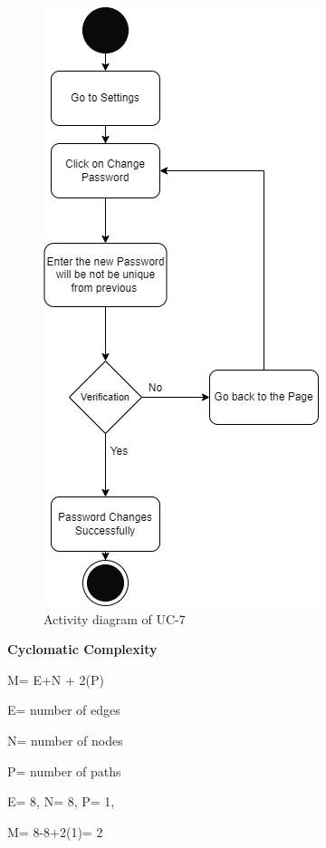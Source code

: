 \begin{figure}[H]
    \centering
    \includegraphics[scale=0.7]{./diagrams/Activity Diagram/ad-05.png}
    \caption{Activity diagram of UC-7}
    \label{fig:act-05}

\end{figure}


\textbf{Cyclomatic Complexity}

M= E+N + 2(P)

E= number of edges

N= number of nodes

P= number of paths

E= 8,
N= 8,
P= 1,

M= 8-8+2(1)= 2

